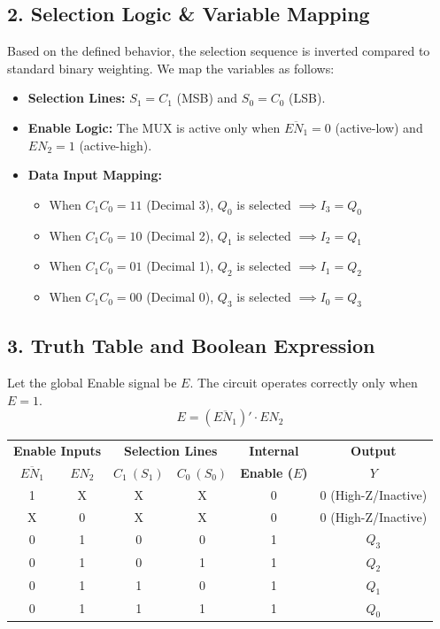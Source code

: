 \documentclass[12pt,a3paper]{article}
\begin{document}
\begin{enumerate}
\begin{tcolorbox}[enhanced,breakable,ansbox,colback=cD!4,colframe=cD,boxrule=0.8pt,arc=5pt,title={\textbf{Answer}},fonttitle=\bfseries\color{white},colbacktitle=cD]
\subsection*{2. Selection Logic \& Variable Mapping}
Based on the defined behavior, the selection sequence is inverted compared to standard binary weighting. We map the variables as follows:
\begin{itemize}
    \item \textbf{Selection Lines:} $S_1 = C_1$ (MSB) and $S_0 = C_0$ (LSB).
    \item \textbf{Enable Logic:} The MUX is active only when $\overline{EN_1} = 0$ (active-low) and $EN_2 = 1$ (active-high). 
    \item \textbf{Data Input Mapping:}
    \begin{itemize}
        \item When $C_1C_0 = 11$ (Decimal 3), $Q_0$ is selected $\implies I_3 = Q_0$
        \item When $C_1C_0 = 10$ (Decimal 2), $Q_1$ is selected $\implies I_2 = Q_1$
        \item When $C_1C_0 = 01$ (Decimal 1), $Q_2$ is selected $\implies I_1 = Q_2$
        \item When $C_1C_0 = 00$ (Decimal 0), $Q_3$ is selected $\implies I_0 = Q_3$
    \end{itemize}
\end{itemize}

\vspace{0.2cm}
\subsection*{3. Truth Table and Boolean Expression}
Let the global Enable signal be $E$. The circuit operates correctly only when $E=1$.
\[ E = (\overline{EN_1})' \cdot EN_2 \]

\begin{center}
\renewcommand{\arraystretch}{1.2}
\begin{tabular}{cc | cc | c | c}
\toprule
\multicolumn{2}{c|}{\textbf{Enable Inputs}} & \multicolumn{2}{c|}{\textbf{Selection Lines}} & \textbf{Internal} & \textbf{Output} \\
$\overline{EN_1}$ & $EN_2$ & $C_1 \ (S_1)$ & $C_0 \ (S_0)$ & \textbf{Enable ($E$)} & \textbf{$Y$} \\
\midrule
1 & X & X & X & 0 & 0 (High-Z/Inactive) \\
X & 0 & X & X & 0 & 0 (High-Z/Inactive) \\
\midrule
0 & 1 & 0 & 0 & 1 & \textcolor{cD}{\textbf{$Q_3$}} \\
0 & 1 & 0 & 1 & 1 & \textcolor{cD}{\textbf{$Q_2$}} \\
0 & 1 & 1 & 0 & 1 & \textcolor{cD}{\textbf{$Q_1$}} \\
0 & 1 & 1 & 1 & 1 & \textcolor{cD}{\textbf{$Q_0$}} \\
\bottomrule
\end{tabular}
\end{center}


\end{tcolorbox}
\end{enumerate}
\end{document}
